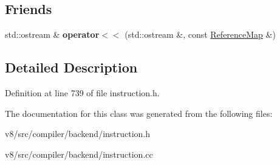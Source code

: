 \subsection*{Friends}
\begin{DoxyCompactItemize}
\item 
\mbox{\label{classv8_1_1internal_1_1compiler_1_1ReferenceMap_a47cdcbce391b2eb011a133bfe63302d6}} 
std\+::ostream \& {\bfseries operator$<$$<$} (std\+::ostream \&, const \mbox{\hyperlink{classv8_1_1internal_1_1compiler_1_1ReferenceMap}{Reference\+Map}} \&)
\end{DoxyCompactItemize}


\subsection{Detailed Description}


Definition at line 739 of file instruction.\+h.



The documentation for this class was generated from the following files\+:\begin{DoxyCompactItemize}
\item 
v8/src/compiler/backend/instruction.\+h\item 
v8/src/compiler/backend/instruction.\+cc\end{DoxyCompactItemize}
